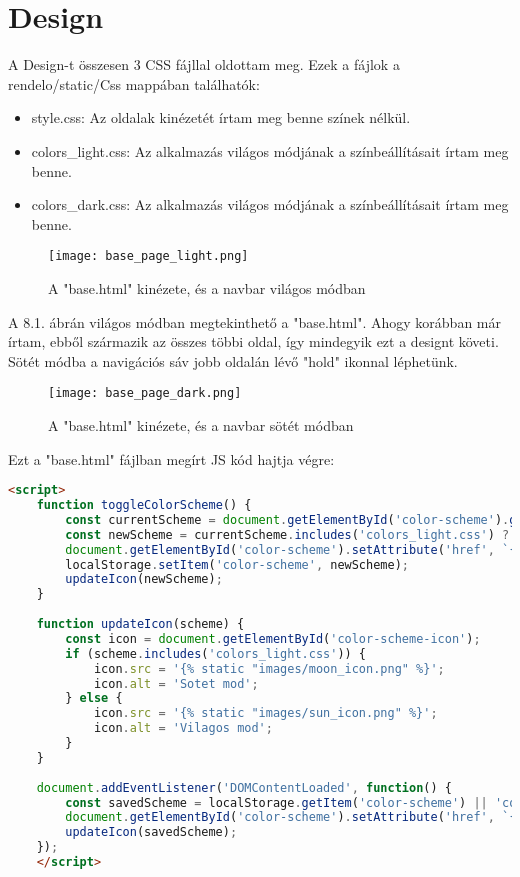 \chapter{Design}
\label{chap:fejezet8}

A Design-t összesen 3 CSS fájllal oldottam meg. Ezek a fájlok a rendelo/static/Css mappában találhatók:

\begin{itemize}
	\item style.css: Az oldalak kinézetét írtam meg benne színek nélkül.
	\item colors\_light.css: Az alkalmazás világos módjának a színbeállításait írtam meg benne.
	\item colors\_dark.css: Az alkalmazás világos módjának a színbeállításait írtam meg benne.
\end{itemize}

\begin{figure}[!htbp]
	\caption{A "base.html" kinézete, és a navbar világos módban}
	\label{fig:lightmode}
	\centering
	\texttt{[image: base\_page\_light.png]}
\end{figure}

A 8.1. ábrán világos módban megtekinthető a "base.html". Ahogy korábban már írtam, ebből származik az összes többi oldal, így mindegyik ezt a designt követi. Sötét módba a navigációs sáv jobb oldalán lévő "hold" ikonnal léphetünk.

\begin{figure}[!htbp]
	\caption{A "base.html" kinézete, és a navbar sötét módban}
	\label{fig:darkmode}
	\centering
	\texttt{[image: base\_page\_dark.png]}
\end{figure}

Ezt a "base.html" fájlban megírt JS kód hajtja végre:

\begin{lstlisting}[caption={A színösszeállítások között váltó JS kód},label={lst:stringstartswith2}, language={HTML}]
	<script>
	function toggleColorScheme() {
		const currentScheme = document.getElementById('color-scheme').getAttribute('href');
		const newScheme = currentScheme.includes('colors_light.css') ? 'colors_dark.css' : 'colors_light.css';
		document.getElementById('color-scheme').setAttribute('href', `{% static 'css/' %}` + newScheme);
		localStorage.setItem('color-scheme', newScheme);
		updateIcon(newScheme);
	}
	
	function updateIcon(scheme) {
		const icon = document.getElementById('color-scheme-icon');
		if (scheme.includes('colors_light.css')) {
			icon.src = '{% static "images/moon_icon.png" %}';
			icon.alt = 'Sotet mod';
		} else {
			icon.src = '{% static "images/sun_icon.png" %}';
			icon.alt = 'Vilagos mod';
		}
	}
	
	document.addEventListener('DOMContentLoaded', function() {
		const savedScheme = localStorage.getItem('color-scheme') || 'colors_light.css';
		document.getElementById('color-scheme').setAttribute('href', `{% static 'css/' %}` + savedScheme);
		updateIcon(savedScheme);
	});
	</script>
	
\end{lstlisting}

